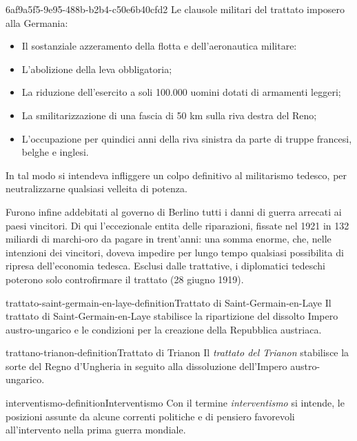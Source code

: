 \documentclass[preview]{standalone}
\begin{document}
\begin{snippet}{6af9a5f5-9e95-488b-b2b4-c50e6b40cfd2}
    Le clausole militari del trattato imposero alla Germania:
    \begin{itemize}
        \item Il sostanziale azzeramento della flotta e dell'aeronautica militare:
        \item L'abolizione della leva obbligatoria;
        \item La riduzione dell'esercito a soli 100.000 uomini dotati di armamenti leggeri;
        \item La smilitarizzazione di una fascia di 50 km sulla riva destra del Reno;
        \item L'occupazione per quindici anni della riva sinistra da parte di truppe francesi, belghe e inglesi.
    \end{itemize}
    
    In tal modo si intendeva infliggere un colpo definitivo al militarismo tedesco, per neutralizzarne
    qualsiasi velleita di potenza.
    
    Furono infine addebitati al governo di Berlino tutti i danni di guerra arrecati ai paesi vincitori.
    Di qui l'eccezionale entita delle riparazioni, fissate nel 1921 in 132 miliardi di marchi-oro da
    pagare in trent'anni: una somma enorme, che, nelle intenzioni dei vincitori, doveva impedire
    per lungo tempo qualsiasi possibilita di ripresa dell'economia tedesca. Esclusi dalle trattative, i
    diplomatici tedeschi poterono solo controfirmare il trattato (28 giugno 1919).
\end{snippet}

\begin{snippetdefinition}{trattato-saint-germain-en-laye-definition}{Trattato di Saint-Germain-en-Laye}
    Il trattato di Saint-Germain-en-Laye
    stabilisce la ripartizione del dissolto Impero austro-ungarico
    e le condizioni per la creazione della Repubblica austriaca. 
\end{snippetdefinition}

\begin{snippetdefinition}{trattano-trianon-definition}{Trattato di Trianon}
    Il \textit{trattato del Trianon} stabilisce la sorte
    del Regno d'Ungheria in seguito alla dissoluzione dell'Impero austro-ungarico. 
\end{snippetdefinition}


\begin{snippetdefinition}{interventismo-definition}{Interventismo}
    Con il termine \textit{interventismo} si intende,
    le posizioni assunte da alcune correnti politiche e di pensiero
    favorevoli all'intervento nella prima guerra mondiale.
\end{snippetdefinition}
\end{document}
